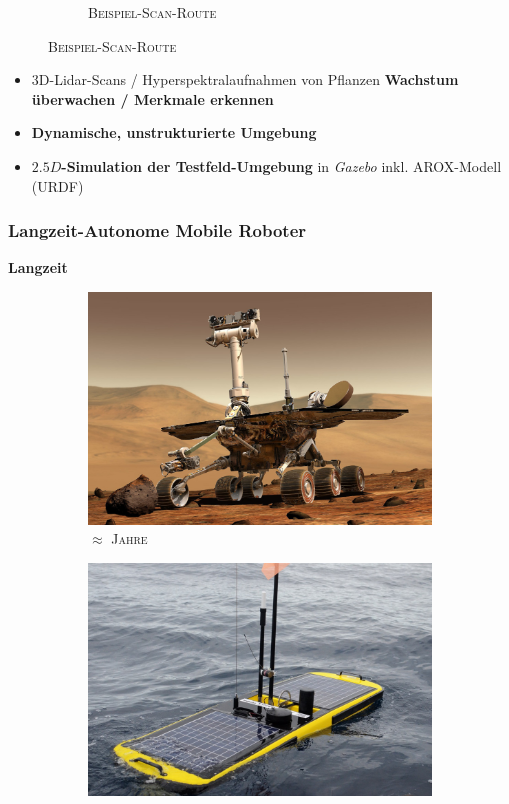 \documentclass{beamer}
\begin{document}
\begin{frame}
\begin{figure}[H]
\begin{subfigure}[b]{0.49\textwidth}
      \caption*{\textsc{Beispiel-Scan-Route}}
    \end{subfigure}
  \end{figure}
  \begin{itemize}
    \item 3D-Lidar-Scans / Hyperspektralaufnahmen von Pflanzen \textrightarrow \thinspace \textbf{Wachstum überwachen / Merkmale erkennen}
    \item \textbf{Dynamische, unstrukturierte Umgebung}
    \item \textbf{$2.5D$-Simulation der Testfeld-Umgebung} in \textit{Gazebo} inkl. AROX-Modell (URDF)
  \end{itemize}
\end{frame}

\begin{frame}
  \frametitle{Langzeit-Autonome Mobile Roboter}
  \textbf{Langzeit}\newline
  \begin{figure}[H]
    \centering
    \begin{subfigure}[b]{0.32\textwidth}
      \centering
      \includegraphics[width=\textwidth]{img/mars_rover.jpg}
      \caption*{\textsc{$\approx$ Jahre \cite{MarsRover}}}
    \end{subfigure}
    \begin{subfigure}[b]{0.32\textwidth}
      \centering
      \includegraphics[width=\textwidth]{img/waveglider.jpg}

\end{subfigure}
\end{figure}
\end{frame}
\end{document}
